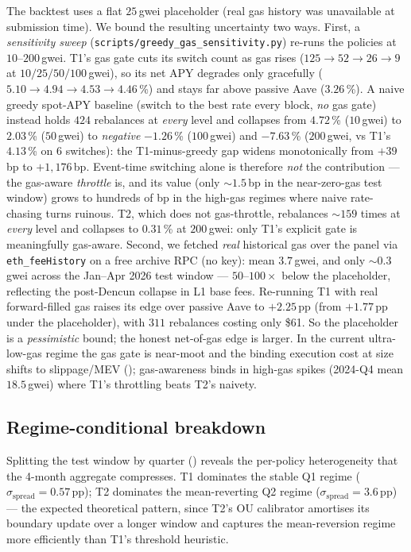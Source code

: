 The backtest uses a flat $25$\,gwei placeholder (real gas history was
unavailable at submission time).  We bound the resulting uncertainty
two ways.  First, a \emph{sensitivity sweep}
(\texttt{scripts/greedy\_gas\_sensitivity.py}) re-runs the policies at
$10$--$200$\,gwei.  T1's gas gate cuts its switch count as gas rises
($125\!\to\!52\!\to\!26\!\to\!9$ at $10/25/50/100$\,gwei), so its net
APY degrades only gracefully ($5.10\!\to\!4.94\!\to\!4.53\!\to\!4.46$\,\%)
and stays far above passive Aave ($3.26$\,\%).  A naive greedy
spot-APY baseline (switch to the best rate every block, \emph{no} gas
gate) instead holds $424$ rebalances at \emph{every} level and collapses
from $4.72$\,\% ($10$\,gwei) to $2.03$\,\% ($50$\,gwei) to \emph{negative}
$-1.26$\,\% ($100$\,gwei) and $-7.63$\,\% ($200$\,gwei, vs T1's $4.13$\,\%
on $6$ switches): the T1-minus-greedy gap widens monotonically from
$+39$\,bp to $+1{,}176$\,bp.  Event-time switching alone is therefore \emph{not} the
contribution --- the gas-aware \emph{throttle} is, and its value (only
$\sim 1.5$\,bp in the near-zero-gas test window) grows to hundreds of bp
in the high-gas regimes where naive rate-chasing turns ruinous.  T2,
which does not gas-throttle, rebalances $\sim 159$ times at \emph{every}
level and collapses to $0.31$\,\% at $200$\,gwei: only T1's explicit gate
is meaningfully gas-aware.
Second, we fetched \emph{real} historical gas over the panel via
\texttt{eth\_feeHistory} on a free archive RPC (no key): mean
$3.7$\,gwei, and only $\sim 0.3$\,gwei across the Jan--Apr 2026 test
window --- $50$--$100\times$ below the placeholder, reflecting the
post-Dencun collapse in L1 base fees.  Re-running T1 with real
forward-filled gas raises its edge over passive Aave to
$+2.25$\,pp (from $+1.77$\,pp under the placeholder), with $311$
rebalances costing only \$61.  So the placeholder is a
\emph{pessimistic} bound; the honest net-of-gas edge is larger.  In
the current ultra-low-gas regime the gas gate is near-moot and the
binding execution cost at size shifts to slippage/MEV
(); gas-awareness binds in high-gas spikes
(2024-Q4 mean $18.5$\,gwei) where T1's throttling beats T2's naivety.

\subsection{Regime-conditional breakdown}
\label{sec:emp-regime}

Splitting the test window by quarter ()
reveals the per-policy heterogeneity that the 4-month aggregate
compresses.  T1 dominates the stable Q1 regime
($\sigma_{\text{spread}} = 0.57$\,pp); T2 dominates the
mean-reverting Q2 regime ($\sigma_{\text{spread}} = 3.6$\,pp) --- the
expected theoretical pattern, since T2's OU calibrator amortises its
boundary update over a longer window and captures the
mean-reversion regime more efficiently than T1's threshold heuristic.


